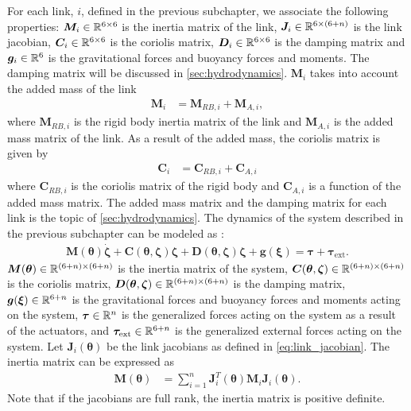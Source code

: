 For each link, $i$, defined in the previous subchapter, we associate the following
properties: $\bm{M}_i \in \mathbb{R}^{6 \times 6}$ is the inertia matrix of the link,
$\bm{J}_i \in \mathbb{R}^{6 \times (6+n)}$ is the link jacobian, $\bm{C}_i \in \mathbb{R}^{6 \times 6}$
is the coriolis matrix, $\bm{D}_i \in \mathbb{R}^{6 \times 6}$ is the damping matrix and
$\bm{g}_i \in \mathbb{R}^{6}$ is the gravitational forces and buoyancy forces and moments.
The damping matrix will be discussed in \autoref{sec:hydrodynamics}.
$\bm{M}_i$ takes into account the added mass of the link
\begin{align}
    \bm{M}_i &= \bm{M}_{RB,i} + \bm{M}_{A,i},
\end{align}
where $\bm{M}_{RB,i}$ is the rigid body inertia matrix of the link and $\bm{M}_{A,i}$
is the added mass matrix of the link. As a result of the added mass, the coriolis
matrix is given by
\begin{align}
    \bm{C}_i &= \bm{C}_{RB,i} + \bm{C}_{A,i}
\end{align}
where $\bm{C}_{RB,i}$ is the coriolis matrix of the rigid body and $\bm{C}_{A,i}$
is a function of the added mass matrix. The added mass matrix and the damping matrix
for each link is the topic of \autoref{sec:hydrodynamics}. The dynamics of the
system described in the previous subchapter can be modeled as
\cite{from2014}:
\begin{align}
    \bm{M}(\bm{\theta})\dot{\bm{\zeta}} +
        \bm{C}(\bm{\theta}, \bm{\zeta}) \bm{\zeta} +
        \bm{D}(\bm{\theta}, \bm{\zeta}) \bm{\zeta} +
        \bm{g}(\bm{\xi}) =
        \bm{\tau} + \bm{\tau}_{\mathrm{ext}}.
\end{align}
$\bm{M}(\bm{\theta}) \in \mathbb{R}^{(6+n)\times(6+n)}$  is the inertia matrix of the
system, $\bm{C}(\bm{\theta}, \bm{\zeta}) \in \mathbb{R}^{(6+n)\times(6+n)}$ is the
coriolis matrix, $\bm{D}(\bm{\theta}, \bm{\zeta}) \in \mathbb{R}^{(6+n)\times(6+n)}$ is
the damping matrix, $\bm{g}(\bm{\xi}) \in \mathbb{R}^{6+n}$ is the gravitational forces
and buoyancy forces and moments acting on the system, $\bm{\tau} \in \mathbb{R}^{n}$ is the generalized
forces acting on the system as a result of the actuators,
and $\bm{\tau}_{\mathrm{ext}} \in \mathbb{R}^{6+n}$ is the
generalized external forces acting on the system. Let $\bm{J}_{i}(\bm{\theta})$
be the link jacobians as defined in \autoref{eq:link_jacobian}.
The inertia matrix
can be expressed as
\begin{align}
    \bm{M}(\bm{\theta}) &= \sum_{i=1}^{n} \bm{J}_{i}^T(\bm{\theta}) \bm{M}_i \bm{J}_{i}(\bm{\theta}).
\end{align}
Note that if the jacobians are full rank, the inertia matrix is positive definite.
